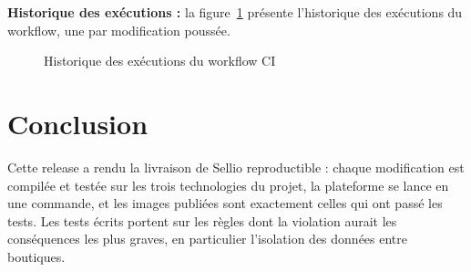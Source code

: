 \textbf{Historique des exécutions :} la figure~\ref{fig:ui-runs} présente l'historique des exécutions du workflow, une par modification poussée.
\begin{figure}[H]
    \centering
    \caption{Historique des exécutions du workflow CI}
    \label{fig:ui-runs}
\end{figure}

\section*{Conclusion}
Cette release a rendu la livraison de Sellio reproductible : chaque modification est compilée et testée sur les trois technologies du projet, la plateforme se lance en une commande, et les images publiées sont exactement celles qui ont passé les tests. Les tests écrits portent sur les règles dont la violation aurait les conséquences les plus graves, en particulier l'isolation des données entre boutiques.
